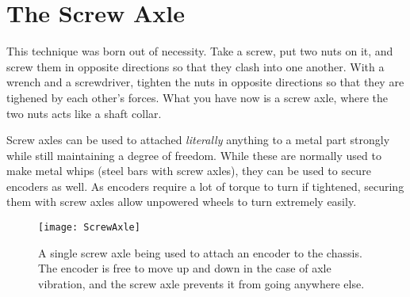 \section{The Screw Axle}

This technique was born out of necessity. Take a screw, put two nuts on it, and screw them in opposite directions so that they clash into one another. With a wrench and a screwdriver, tighten the nuts in opposite directions so that they are tighened by each other's forces. What you have now is a screw axle, where the two nuts acts like a shaft collar.

Screw axles can be used to attached \textit{literally} anything to a metal part strongly while still maintaining a degree of freedom. While these are normally used to make metal whips (steel bars with screw axles), they can be used to secure encoders as well. As encoders require a lot of torque to turn if tightened, securing them with screw axles allow unpowered wheels to turn extremely easily.

\begin{figure}[h]
    \centering
    \texttt{[image: ScrewAxle]}
    \caption{
        A single screw axle being used to attach an encoder to the chassis. The encoder is free to move up and down in the case of axle vibration, and the screw axle prevents it from going anywhere else.
    }
\end{figure}
